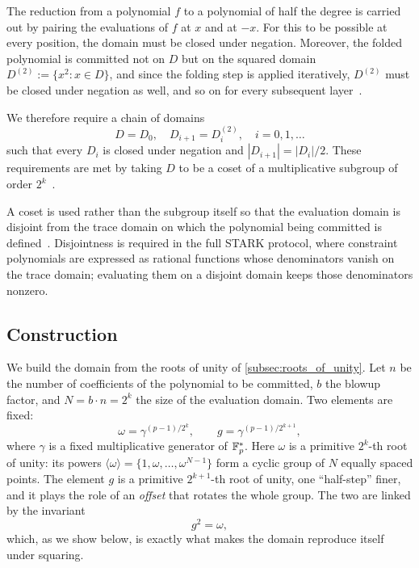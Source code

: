 The reduction from a polynomial $f$ to a polynomial of half the degree
is carried out by pairing the evaluations of $f$ at $x$ and at $-x$. %
For this to be possible at every position,
the domain must be closed under negation. Moreover, the folded
polynomial is committed not on $D$ but on the squared domain
$D^{(2)} := \{x^2 : x \in D\}$, and since the folding step is applied
iteratively, $D^{(2)}$ must be closed under negation as well, and so
on for every subsequent layer~\cite[Section~3.9.1]{ethSTARK}.
 
We therefore require a chain of domains
%
\[
D = D_0, \quad D_{i+1} = D_i^{(2)}, \quad i = 0, 1, \ldots
\]
%
such that every $D_i$ is closed under negation and
$|D_{i+1}| = |D_i|/2$. These requirements are met by taking $D$ to be
a coset of a multiplicative subgroup of order
$2^k$~\cite[Section~3.9.1]{ethSTARK}.
 
A coset is used rather than the subgroup itself so that the evaluation
domain is disjoint from the trace domain on which the polynomial being
committed is defined~\cite[Section~3.4]{ethSTARK}. Disjointness is
required in the full STARK protocol, where constraint polynomials are
expressed as rational functions whose denominators vanish on the trace
domain; evaluating them on a disjoint domain keeps those denominators
nonzero.
 
 
\subsection{Construction}
\label{subsec:domain_construction}

We build the domain from the roots of unity of \cref{subsec:roots_of_unity}.
Let $n$ be the number of coefficients of the polynomial to be committed,
$b$ the blowup factor, and $N = b \cdot n = 2^k$ the size of the
evaluation domain. Two elements are fixed:
%
\begin{equation}
\label{eq:domain_generators}
\omega = \gamma^{(p-1)/2^{k}}, \qquad
g = \gamma^{(p-1)/2^{k+1}},
\end{equation}
%
where $\gamma$ is a fixed multiplicative generator of $\mathbb{F}_p^*$. Here
$\omega$ is a primitive $2^k$-th root of unity: its powers
$\langle\omega\rangle = \{1, \omega, \ldots, \omega^{N-1}\}$ form a
cyclic group of $N$ equally spaced points. The element $g$ is a
primitive $2^{k+1}$-th root of unity, one ``half-step'' finer, and it
plays the role of an \emph{offset} that rotates the whole group. The
two are linked by the invariant
%
\begin{equation}
\label{eq:g_squared}
g^2 = \omega,
\end{equation}
%
which, as we show below, is exactly what makes the domain reproduce
itself under squaring.

